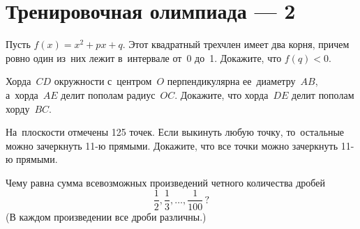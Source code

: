 
\section*{Тренировочная олимпиада --- 2}


\begin{problems}

\item
Пусть $f(x) = x^2 + p x + q$.
Этот квадратный трехчлен имеет два корня, причем ровно один из~них лежит
в~интервале от~0 до~1.
Докажите, что $f(q) < 0$.

\item
Хорда~$CD$ окружности с~центром~$O$ перпендикулярна ее~диаметру~$AB$,
а~хорда~$AE$ делит пополам радиус~$OC$.
Докажите, что хорда~$DE$ делит пополам хорду~$BC$.

\item
На~плоскости отмечены 125 точек.
Если выкинуть любую точку, то~остальные можно зачеркнуть 11-ю прямыми.
Докажите, что все точки можно зачеркнуть 11-ю прямыми.

\item
Чему равна сумма всевозможных произведений четного количества дробей
\[
    \frac{1}{2}, \frac{1}{3}, \ldots, \frac{1}{100}
\,?\]
(В каждом произведении все дроби различны.)

\end{problems}

